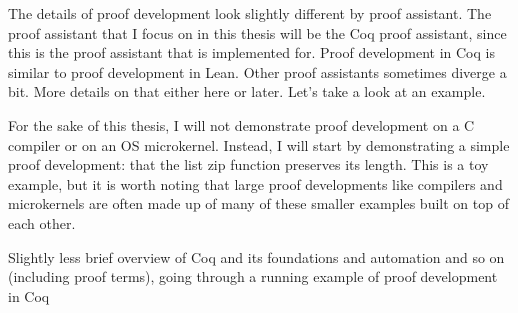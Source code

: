 The details of proof development look slightly different by proof assistant.
The proof assistant that I focus on in this thesis will be the Coq proof assistant,
since this is the proof assistant that \toolname is implemented for.
Proof development in Coq is similar to proof development in Lean.
Other proof assistants sometimes diverge a bit.
More details on that either here or later.
Let's take a look at an example.

For the sake of this thesis, I will not demonstrate proof development on a C compiler or on an OS microkernel.
Instead, I will start by demonstrating a simple proof development: 
that the list zip function preserves its length.
This is a toy example, but it is worth noting that large proof developments like compilers and microkernels
are often made up of many of these smaller examples built on top of each other.

Slightly less brief overview of Coq and its foundations and automation and so on (including proof terms), going through a running example of proof development in Coq

